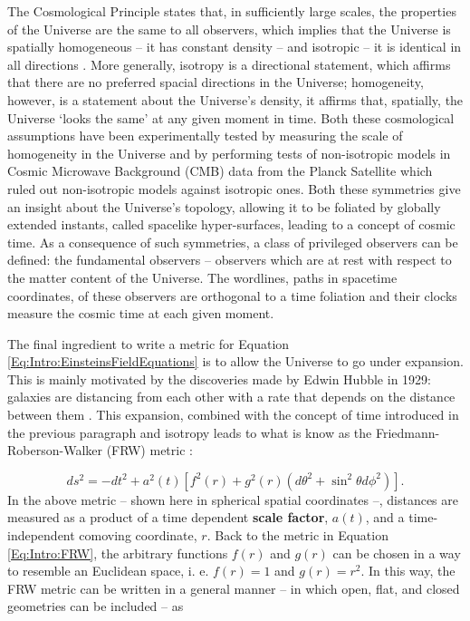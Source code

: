 \qquad The Cosmological Principle states that, in sufficiently large scales, the properties of the Universe are the same to all observers, which implies that the Universe is spatially homogeneous -- it has constant density  -- and isotropic -- it is identical in all directions \citep{keel2002road}.  More generally, isotropy is a directional statement, which affirms that there are no preferred spacial directions in the Universe; homogeneity, however, is a statement about the Universe's density, it affirms that, spatially, the Universe `looks the same' at any given moment in time. Both these cosmological assumptions have been experimentally tested by measuring the scale of homogeneity in the Universe \citep{1999NaturWu} and by performing tests of non-isotropic models in Cosmic Microwave Background (CMB) data from the Planck Satellite \citep{2016PhRvLSaadeh} which ruled out non-isotropic models against isotropic ones. Both these symmetries give an insight about the Universe's topology, allowing it to be foliated by globally extended instants, called spacelike hyper-surfaces, leading to a concept of cosmic time. As a consequence of such symmetries, a class of privileged observers can be defined: the fundamental observers -- observers which are at rest with respect to the matter content of the Universe. The wordlines, paths in spacetime coordinates, of these observers are orthogonal to a time foliation and their clocks measure the cosmic time at each given moment. 

\qquad The final ingredient to write a metric for Equation \eqref{Eq:Intro:EinsteinsFieldEquations} is to allow the Universe to go under expansion. This is mainly motivated by the discoveries made by Edwin Hubble in 1929: galaxies are distancing from each other with a rate that depends on the distance between them \citep{1929Hubble}. This expansion, combined with the concept of time introduced in the previous paragraph and isotropy leads to what is know as the Friedmann-Roberson-Walker (FRW) metric \citep{1922Friedmann,Peacock,dods}:


\begin{equation}
ds^2 = -dt^2 + a^2(t)\left[f^2(r) + g^2(r)\left(d\theta^2 + \sin^2\theta d\phi^2\right)\right].
\label{Eq:Intro:FRW}
\end{equation}
In the above metric -- shown here in spherical spatial coordinates --, distances are measured as a product of a time dependent \textbf{scale factor}, $a(t)$, and a time-independent comoving coordinate, $r$. Back to the metric in Equation \eqref{Eq:Intro:FRW}, the arbitrary functions $f(r)$ and $g(r)$ can be chosen in a way to resemble an Euclidean space, i. e. $f(r) = 1$ and $g(r) = r^2$. In this way, the FRW metric can be written in a general manner -- in which open, flat, and closed geometries can be included -- as 


